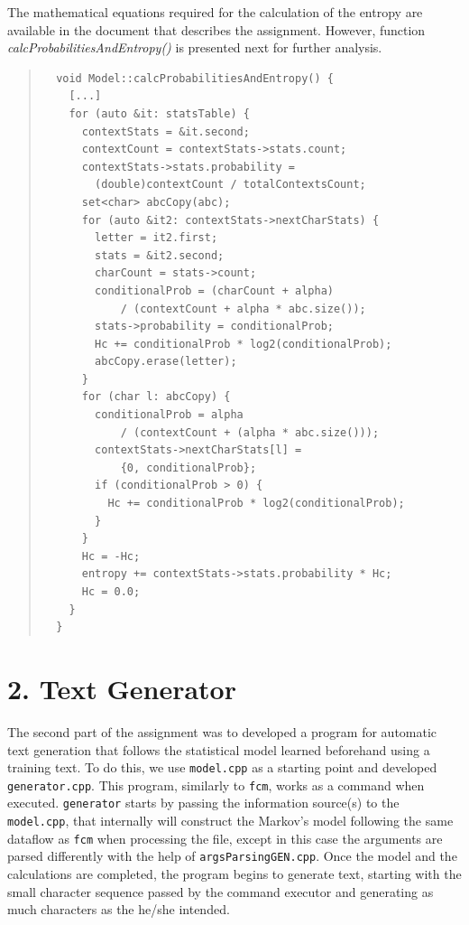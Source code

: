 \documentclass[12pt]{article}
\begin{document}
\newpage
The mathematical equations required for the calculation of the entropy are 
available in the document that describes the assignment.
However, function {\it calcProbabilitiesAndEntropy()\/} is presented next 
for further analysis.

\begingroup
\addtolength\leftmargini{-0.4in}
\addtolength\baselineskip{-0.05in}
\begin{quote}
\begin{verbatim}
  void Model::calcProbabilitiesAndEntropy() {
    [...]
    for (auto &it: statsTable) {
      contextStats = &it.second;
      contextCount = contextStats->stats.count;
      contextStats->stats.probability = 
        (double)contextCount / totalContextsCount;
      set<char> abcCopy(abc);
      for (auto &it2: contextStats->nextCharStats) {
        letter = it2.first;
        stats = &it2.second;
        charCount = stats->count;
        conditionalProb = (charCount + alpha)
            / (contextCount + alpha * abc.size());
        stats->probability = conditionalProb;
        Hc += conditionalProb * log2(conditionalProb);
        abcCopy.erase(letter);
      }
      for (char l: abcCopy) {
        conditionalProb = alpha
            / (contextCount + (alpha * abc.size()));
        contextStats->nextCharStats[l] = 
            {0, conditionalProb};
        if (conditionalProb > 0) {
          Hc += conditionalProb * log2(conditionalProb);
        }
      }
      Hc = -Hc; 
      entropy += contextStats->stats.probability * Hc;
      Hc = 0.0;
    }
  }
\end{verbatim}
\end{quote}
\endgroup

\newpage
\section*{2. Text Generator}

The second part of the assignment was to developed a program for automatic
text generation that follows the statistical model learned beforehand using 
a training text.
To do this, we use \texttt{model.cpp} as a starting point and developed 
\texttt{generator.cpp}. 
This program, similarly to \texttt{fcm}, works as a command when executed.
\texttt{generator} starts by passing the information source(s) to the 
\texttt{model.cpp}, that internally will construct the Markov's model 
following the same dataflow as \texttt{fcm} when processing the file,
except in this case the arguments are parsed differently with the help of
\texttt{argsParsingGEN.cpp}. 
Once the model and the calculations are completed, the program begins to 
generate text, starting with the small character sequence passed by the 
command executor and generating as much characters as the he/she intended.
\end{document}
